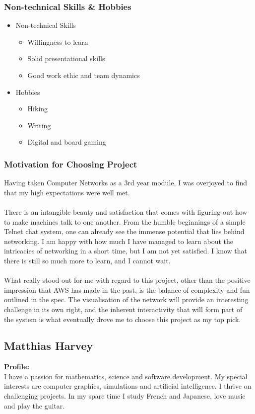 \documentclass{article}
\begin{document}
\subsubsection{Non-technical Skills \& Hobbies}
\begin{itemize}
	\item Non-technical Skills
	\begin{itemize}
		\item Willingness to learn
		\item Solid presentational skills
		\item Good work ethic and team dynamics
	\end{itemize}
	\item Hobbies
	\begin{itemize}
		\item Hiking
		\item Writing
		\item Digital and board gaming
	\end{itemize}
\end{itemize}
\subsubsection{Motivation for Choosing Project}
Having taken Computer Networks as a 3rd year module, I was overjoyed to find that my high 	expectations were well met. 
\\\\
There is an intangible beauty and satisfaction that comes with figuring out how to make machines talk to one another. From the humble beginnings of a simple Telnet chat system, one can already see the immense potential that lies behind networking. I am happy with how much I have managed to learn about the intricacies of networking in a short time, but I am not yet satisfied. I know that there is still so much more to learn, and I cannot wait.
\\\\
What really stood out for me with regard to this project, other than the positive impression that AWS has made in the past, is the balance of complexity and fun outlined in the spec. The visualisation of the network will provide an interesting challenge in its own right, and the inherent interactivity that will form part of the system is what eventually drove me to choose this project as my top pick.  

\cleardoublepage

\subsection{Matthias Harvey}
\textbf{Profile:}\\
I have a passion for mathematics, science and software development. My special interests are computer graphics, simulations and artificial intelligence. I thrive on challenging projects. In my spare time I study French and Japanese, love music and play the guitar.
\end{document}
